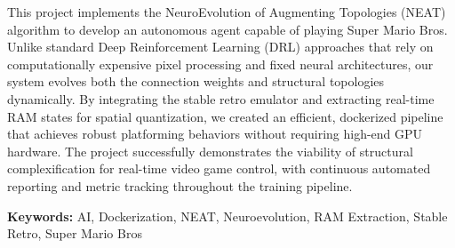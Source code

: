 
This project implements the NeuroEvolution of Augmenting Topologies (NEAT)
algorithm to develop an autonomous agent capable of playing Super Mario Bros.
Unlike standard Deep Reinforcement Learning (DRL) approaches that rely on
computationally expensive pixel processing and fixed neural architectures, our
system evolves both the connection weights and structural topologies
dynamically. By integrating the stable retro emulator and extracting real-time
RAM states for spatial quantization, we created an efficient, dockerized
pipeline that achieves robust platforming behaviors without requiring high-end
GPU hardware. The project successfully demonstrates the viability of structural
complexification for real-time video game control, with continuous automated
reporting and metric tracking throughout the training pipeline.

\vspace{0.8cm}

\noindent\textbf{Keywords:}
AI, Dockerization, NEAT, Neuroevolution, RAM Extraction, Stable Retro, Super Mario Bros

\clearpage

